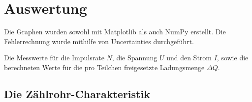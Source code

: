 \section{Auswertung}
\label{sec:Auswertung}

Die Graphen wurden sowohl mit Matplotlib \cite{matplotlib} als auch NumPy \cite{numpy} erstellt. Die
Fehlerrechnung wurde mithilfe von Uncertainties \cite{uncertainties} durchgeführt.

\begin{table}
	\centering
	\caption{Die Messwerte für die Impulsrate $N$, die Spannung $U$ und den Strom $I$, sowie die berechneten Werte für die pro Teilchen freigesetzte Ladungsmenge $\Delta Q$.}
	
	\label{tab:tab1}
\end{table}

\subsection{Die Zählrohr-Charakteristik}

